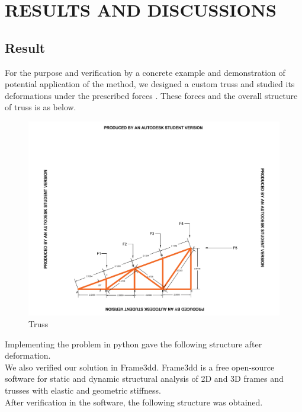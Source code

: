 
\chapter{RESULTS AND DISCUSSIONS}

\section{{\bf{Result}}}

For the purpose and verification by a concrete example and demonstration of potential application of the method, we designed a custom truss and studied its deformations under the prescribed forces . These forces and the overall structure of truss is as below.\\
\noindent

\begin{figure}
	\centering
	\includegraphics[width=0.6\linewidth , height=0.2\linewidth]{Drawing1.pdf}
	\caption{Truss}
\end{figure}

\noindent

Implementing the problem in python gave the following structure after deformation.\\



We also verified our solution in Frame3dd. Frame3dd is a free open-source software for static and dynamic structural analysis of 2D and 3D frames and trusses with elastic and geometric stiffness.\\

After verification in the software, the following structure was obtained.\\

